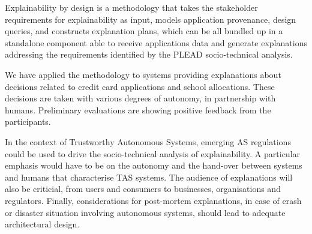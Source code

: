 \documentclass[sigconf]{acmart}
\begin{document}
Explainability by design is a methodology that takes the stakeholder requirements for explainability as input, models application provenance, design queries, and constructs explanation plans, which can be all bundled up in a standalone component able to receive applications data and generate explanations addressing the requirements identified by the PLEAD socio-technical analysis.


We have applied the methodology to systems providing explanations about decisions related to credit card applications and school allocations. These decisions are taken with various degrees of autonomy, in partnership with humans.  Preliminary evaluations are showing positive feedback from the participants.

In the context of Trustworthy Autonomous Systems, emerging AS regulations could be used to drive the socio-technical analysis of explainability.  A particular emphasis would have to be on the autonomy and the hand-over between systems and humans that characterise  TAS systems.  The audience of explanations will also be criticial, from users and consumers to businesses, organisations and regulators.  Finally, considerations for post-mortem explanations, in case of crash or disaster situation involving autonomous systems, should lead to adequate architectural design.


\end{document}
